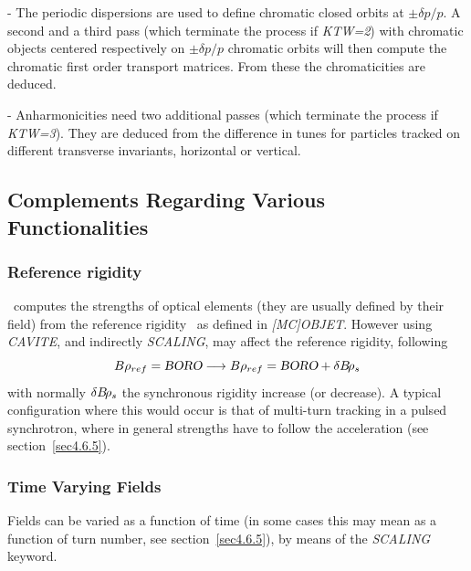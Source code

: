 - The periodic dispersions  are used to define chromatic closed orbits at $\pm \delta p / p$. A second and a third pass 
(which terminate the process if \textsl{KTW=2}) with 
chromatic objects centered respectively  on $\pm \delta p / p$ chromatic orbits will then compute the chromatic 
first order transport matrices. From these the chromaticities are deduced. 

- Anharmonicities need two additional passes (which terminate the process if \textsl{KTW=3}). 
They are deduced from the difference in tunes for particles 
tracked on different transverse invariants, horizontal or vertical. 



\newpage




\subsection{Complements Regarding Various Functionalities} \label{sec4.6}  


\subsubsection{Reference rigidity}  \label{sec4.6.RefBORO} 

\zgoubi\ computes the strengths of optical elements (they are usually defined by their field) from the reference 
rigidity \BORO\ as defined in \textsl{[MC]OBJET}. However using \textsl{CAVITE}, and indirectly \textsl{SCALING},  
may affect the reference rigidity, following 
$$B\rho_{ref} = \textsl{BORO} \longrightarrow B\rho_{ref} = \textsl{BORO} + \delta B\!\rho_s$$ 
\noindent with normally $\delta B\!\rho_s$ the synchronous rigidity increase (or decrease). A typical configuration where this would 
occur is that of multi-turn tracking in a pulsed synchrotron, where in general strengths have to follow the  
acceleration (see section~\ref{sec4.6.5}). 



\subsubsection{Time Varying Fields} \label{sec4.6.TimeVFields} 

Fields can be varied as a function of time  (in some cases this may mean as a function of turn number, 
see section~\ref{sec4.6.5}), by means of the  \textsl{SCALING} keyword. 

